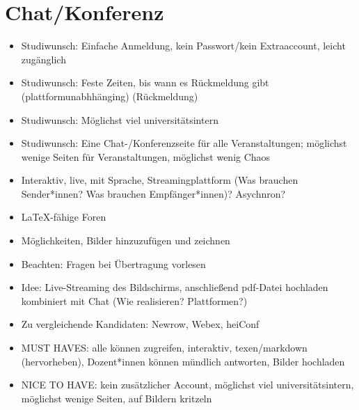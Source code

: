 \documentclass[parskip=off,index=totocnumbered]{scrreprt}
\begin{document}
\chapter{Chat/Konferenz}
   \begin{itemize}
      \item Studiwunsch: Einfache Anmeldung, kein Passwort/kein Extraaccount, leicht zugänglich
      \item Studiwunsch: Feste Zeiten, bis wann es Rückmeldung gibt (plattformunabhhänging) (Rückmeldung)
      \item Studiwunsch: Möglichst viel universitätsintern
      \item Studiwunsch: Eine Chat-/Konferenzseite für alle Veranstaltungen; möglichst wenige Seiten für Veranstaltungen, möglichst wenig Chaos
      \item Interaktiv, live, mit Sprache, Streamingplattform (Was brauchen Sender*innen? Was brauchen Empfänger*innen)? Asychnron?
      \item \LaTeX-fähige Foren
      \item Möglichkeiten, Bilder hinzuzufügen und zeichnen
      \item Beachten: Fragen bei Übertragung vorlesen
      \item Idee: Live-Streaming des Bildschirms, anschließend pdf-Datei hochladen kombiniert mit Chat (Wie realisieren? Plattformen?)
      \item Zu vergleichende Kandidaten: Newrow, Webex, heiConf
      \item MUST HAVES: alle können zugreifen, interaktiv, texen/markdown (hervorheben), Dozent*innen können mündlich antworten, Bilder hochladen
      \item NICE TO HAVE: kein zusätzlicher Account, möglichst viel universitätsintern, möglichst wenige Seiten, auf Bildern kritzeln
   \end{itemize}
\end{document}
